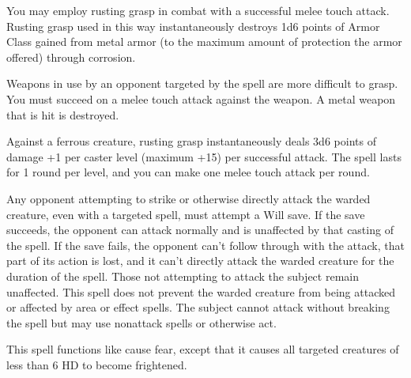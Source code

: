 \begin{multicols}{2}
\begin{small}
\smallskip\noindent You may employ rusting grasp in combat with a successful melee touch attack. Rusting grasp used in this way instantaneously destroys 1d6 points of Armor Class gained from metal armor (to the maximum amount of protection the armor offered) through corrosion. 

\smallskip\noindent Weapons in use by an opponent targeted by the spell are more difficult to grasp. You must succeed on a melee touch attack against the weapon. A metal weapon that is hit is destroyed.


\smallskip\noindent Against a ferrous creature, rusting grasp instantaneously deals 3d6 points of damage +1 per caster level (maximum +15) per successful attack. The spell lasts for 1 round per level, and you can make one melee touch attack per round.

\noindent Any opponent attempting to strike or otherwise directly attack the warded creature, even with a targeted spell, must attempt a Will save. If the save succeeds, the opponent can attack normally and is unaffected by that casting of the spell. If the save fails, the opponent can't follow through with the attack, that part of its action is lost, and it can't directly attack the warded creature for the duration of the spell. Those not attempting to attack the subject remain unaffected. This spell does not prevent the warded creature from being attacked or affected by area or effect spells. The subject cannot attack without breaking the spell but may use nonattack spells or otherwise act.

\noindent This spell functions like cause fear, except that it causes all targeted creatures of less than 6 HD to become frightened.


\end{small}
\end{multicols}
